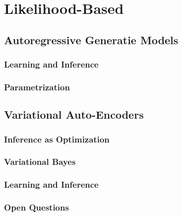     \section{Likelihood-Based} %

        \subsection{Autoregressive Generatie Models} %

            \subsubsection{Learning and Inference} %

            \subsubsection{Parametrization} %

        \subsection{Variational Auto-Encoders} %

            \subsubsection{Inference as Optimization} %

            \subsubsection{Variational Bayes} %

            \subsubsection{Learning and Inference} %

            \subsubsection{Open Questions} %

